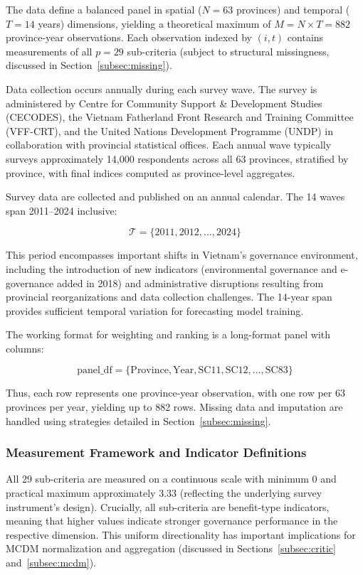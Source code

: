 \documentclass[12pt,a4paper]{article}
\begin{document}
The data define a balanced panel in spatial ($N = 63$ provinces) and temporal ($T = 14$ years) dimensions, yielding a theoretical maximum of $M = N \times T = 882$ province-year observations. Each observation indexed by $(i, t)$ contains measurements of all $p = 29$ sub-criteria (subject to structural missingness, discussed in Section~\ref{subsec:missing}).

Data collection occurs annually during each survey wave. The survey is administered by Centre for Community Support \& Development Studies (CECODES), the Vietnam Fatherland Front Research and Training Committee (VFF-CRT), and the United Nations Development Programme (UNDP) in collaboration with provincial statistical offices. Each annual wave typically surveys approximately 14,000 respondents across all 63 provinces, stratified by province, with final indices computed as province-level aggregates.

Survey data are collected and published on an annual calendar. The 14 waves span 2011--2024 inclusive:

$$\mathcal{T} = \{2011, 2012, \ldots, 2024\}$$

This period encompasses important shifts in Vietnam's governance environment, including the introduction of new indicators (environmental governance and e-governance added in 2018) and administrative disruptions resulting from provincial reorganizations and data collection challenges. The 14-year span provides sufficient temporal variation for forecasting model training.

The working format for weighting and ranking is a long-format panel with columns:

$$\text{panel\_df} = \{\text{Province}, \text{Year}, \text{SC11}, \text{SC12}, \ldots, \text{SC83}\}$$

Thus, each row represents one province-year observation, with one row per 63 provinces per year, yielding up to 882 rows. Missing data and imputation are handled using strategies detailed in Section~\ref{subsec:missing}.

\subsubsection{Measurement Framework and Indicator Definitions}

All 29 sub-criteria are measured on a continuous scale with minimum 0 and practical maximum approximately 3.33 (reflecting the underlying survey instrument's design). Crucially, all sub-criteria are benefit-type indicators, meaning that higher values indicate stronger governance performance in the respective dimension. This uniform directionality has important implications for MCDM normalization and aggregation (discussed in Sections~\ref{subsec:critic} and~\ref{subsec:mcdm}).
\end{document}
